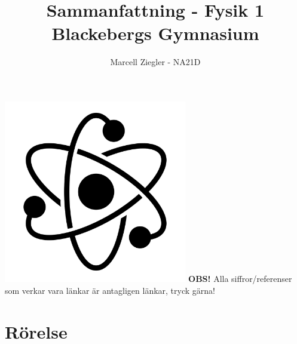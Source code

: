 \documentclass[12pt, a4paper]{article}
\title{Sammanfattning - Fysik 1 \\ Blackebergs Gymnasium}
\author{Marcell Ziegler - NA21D}
\theoremstyle{definition}
\begin{document}
    \begin{titlepage}
        \maketitle
        \centering
        \vfill
        \includegraphics[width=0.6\textwidth]{title.jpg}
        \vfill
        \textbf{OBS!} Alla siffror/referenser som verkar vara länkar är antagligen länkar, tryck gärna!
    \end{titlepage}

    \tableofcontents

    \newpage

    \part{Rörelse}
    
    
\end{document}
